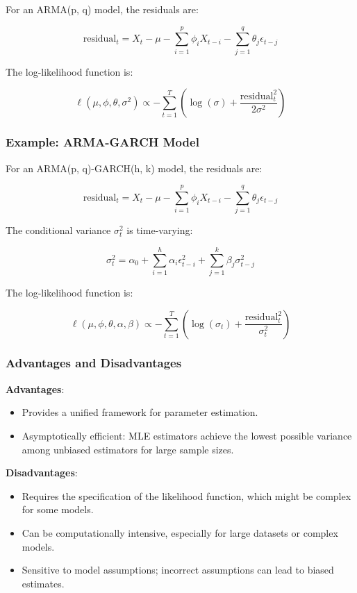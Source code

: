 For an ARMA(p, q) model, the residuals are:

\[ \text{residual}_t = X_t - \mu - \sum_{i=1}^p \phi_i X_{t-i} - \sum_{j=1}^q \theta_j \epsilon_{t-j} \]

The log-likelihood function is:

\[ \ell(\mu, \phi, \theta, \sigma^2) \propto -\sum_{t=1}^{T} \left( \log(\sigma) + \frac{\text{residual}_t^2}{2\sigma^2} \right) \]

\subsubsection*{Example: ARMA-GARCH Model}

For an ARMA(p, q)-GARCH(h, k) model, the residuals are:

\[ \text{residual}_t = X_t - \mu - \sum_{i=1}^p \phi_i X_{t-i} - \sum_{j=1}^q \theta_j \epsilon_{t-j} \]

The conditional variance \(\sigma_t^2\) is time-varying:

\[ \sigma_t^2 = \alpha_0 + \sum_{i=1}^h \alpha_i \epsilon_{t-i}^2 + \sum_{j=1}^k \beta_j \sigma_{t-j}^2 \]

The log-likelihood function is:

\[ \ell(\mu, \phi, \theta, \alpha, \beta) \propto -\sum_{t=1}^{T} \left( \log(\sigma_t) + \frac{\text{residual}_t^2}{\sigma_t^2} \right) \]

\subsubsection*{Advantages and Disadvantages}

\textbf{Advantages}:
\begin{itemize}
    \item Provides a unified framework for parameter estimation.
    \item Asymptotically efficient: MLE estimators achieve the lowest possible variance among unbiased estimators for large sample sizes.
\end{itemize}

\textbf{Disadvantages}:
\begin{itemize}
    \item Requires the specification of the likelihood function, which might be complex for some models.
    \item Can be computationally intensive, especially for large datasets or complex models.
    \item Sensitive to model assumptions; incorrect assumptions can lead to biased estimates.
\end{itemize}




